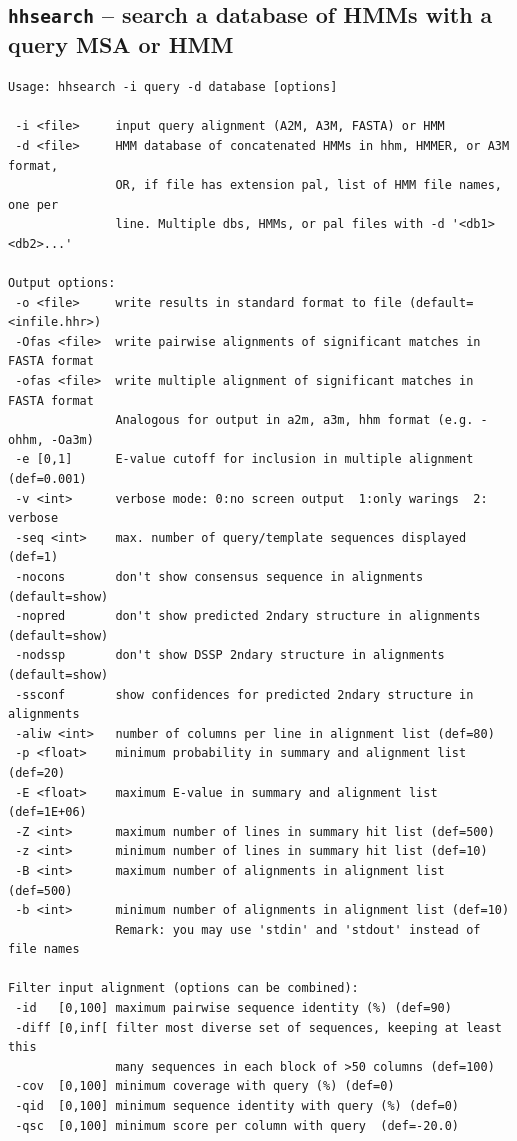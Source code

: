 \documentclass[11pt,a4paper]{article}
\begin{document}
\subsection{{\tt hhsearch} -- search a database of HMMs with a query MSA or HMM}

\small 
\begin{verbatim}
Usage: hhsearch -i query -d database [options]                       

 -i <file>     input query alignment (A2M, A3M, FASTA) or HMM
 -d <file>     HMM database of concatenated HMMs in hhm, HMMER, or A3M format,
               OR, if file has extension pal, list of HMM file names, one per
               line. Multiple dbs, HMMs, or pal files with -d '<db1> <db2>...'

Output options:                                                              
 -o <file>     write results in standard format to file (default=<infile.hhr>)
 -Ofas <file>  write pairwise alignments of significant matches in FASTA format
 -ofas <file>  write multiple alignment of significant matches in FASTA format
               Analogous for output in a2m, a3m, hhm format (e.g. -ohhm, -Oa3m)
 -e [0,1]      E-value cutoff for inclusion in multiple alignment (def=0.001)    
 -v <int>      verbose mode: 0:no screen output  1:only warings  2: verbose   
 -seq <int>    max. number of query/template sequences displayed (def=1) 
 -nocons       don't show consensus sequence in alignments (default=show)     
 -nopred       don't show predicted 2ndary structure in alignments (default=show)
 -nodssp       don't show DSSP 2ndary structure in alignments (default=show)  
 -ssconf       show confidences for predicted 2ndary structure in alignments
 -aliw <int>   number of columns per line in alignment list (def=80)
 -p <float>    minimum probability in summary and alignment list (def=20)   
 -E <float>    maximum E-value in summary and alignment list (def=1E+06)       
 -Z <int>      maximum number of lines in summary hit list (def=500)         
 -z <int>      minimum number of lines in summary hit list (def=10)         
 -B <int>      maximum number of alignments in alignment list (def=500)      
 -b <int>      minimum number of alignments in alignment list (def=10)      
               Remark: you may use 'stdin' and 'stdout' instead of file names

Filter input alignment (options can be combined):                             
 -id   [0,100] maximum pairwise sequence identity (%) (def=90)   
 -diff [0,inf[ filter most diverse set of sequences, keeping at least this    
               many sequences in each block of >50 columns (def=100)
 -cov  [0,100] minimum coverage with query (%) (def=0) 
 -qid  [0,100] minimum sequence identity with query (%) (def=0) 
 -qsc  [0,100] minimum score per column with query  (def=-20.0)


\end{verbatim}
\end{document}
